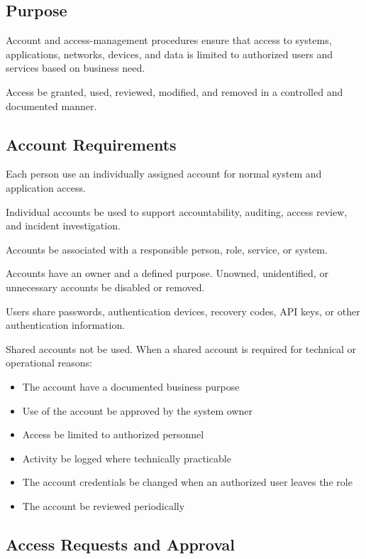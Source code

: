 \subsection{Purpose}

Account and access-management procedures ensure that access to systems, applications, networks, devices, and data is limited to authorized users and services based on business need.

Access \must{} be granted, used, reviewed, modified, and removed in a controlled and documented manner.

\subsection{Account Requirements}

Each person \must{} use an individually assigned account for normal system and application access.

Individual accounts \must{} be used to support accountability, auditing, access review, and incident investigation.

Accounts \must{} be associated with a responsible person, role, service, or system.

Accounts \must{} have an owner and a defined purpose. Unowned, unidentified, or unnecessary accounts \must{} be disabled or removed.

Users \mustnot{} share passwords, authentication devices, recovery codes, API keys, or other authentication information.

Shared accounts \should{} not be used. When a shared account is required for technical or operational reasons:
\begin{itemize}
    \item The account \must{} have a documented business purpose
    \item Use of the account \must{} be approved by the system owner
    \item Access \must{} be limited to authorized personnel
    \item Activity \must{} be logged where technically practicable
    \item The account credentials \must{} be changed when an authorized user leaves the role
    \item The account \must{} be reviewed periodically
\end{itemize}

\subsection{Access Requests and Approval}

